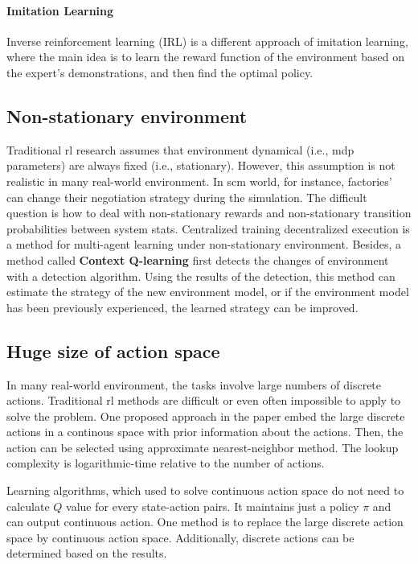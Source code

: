 \paragraph{Imitation Learning\parencite{DBLP:journals/corr/HesterVPLSPSDOA17}} Inverse reinforcement learning (IRL) is a different approach of imitation learning, where the main idea is to learn the reward function of the environment based on the expert’s demonstrations, and then find the optimal policy.

\subsection{Non-stationary environment}
Traditional \gls{rl} research assumes that environment dynamical (i.e., \gls{mdp} parameters) are always fixed (i.e., stationary). However, this assumption is not realistic in many real-world environment. In \gls{scm} world, for instance, factories' can change their negotiation strategy during the simulation. The difficult question is how to deal with non-stationary rewards and non-stationary transition probabilities between system stats. Centralized training decentralized execution\parencite{maddpg2017} is a method for multi-agent learning under non-stationary environment. Besides, a method called \textbf{Context Q-learning}\parencite{Padakandla_2020} first detects the changes of environment with a detection algorithm. Using the results of the detection, this method can estimate the strategy of the new environment model, or if the environment model has been previously experienced, the learned strategy can be improved.

\subsection{Huge size of action space}
In many real-world environment, the tasks involve large numbers of discrete actions. Traditional \gls{rl} methods are difficult or even often impossible to apply to solve the problem. One proposed approach in the paper \parencite{dulacarnold2016deep} embed the large discrete actions in a continous space with prior information about the actions. Then, the action can be selected using approximate nearest-neighbor method. The lookup complexity is logarithmic-time relative to the number of actions.

Learning algorithms, which used to solve continuous action space do not need to calculate $Q$ value for every state-action pairs. It maintains just a policy $\pi$ and can output continuous action. One method is to replace the large discrete action space by continuous action space. Additionally, discrete actions can be determined based on the results.

